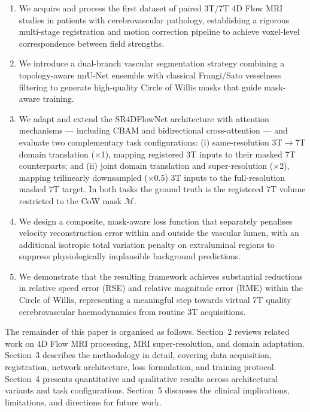\documentclass[11pt]{article}
\begin{document}
\begin{enumerate}
    \item We acquire and process the first dataset of paired 3T/7T 4D Flow MRI studies in patients with cerebrovascular pathology, establishing a rigorous multi-stage registration and motion correction pipeline to achieve voxel-level correspondence between field strengths.

    \item We introduce a dual-branch vascular segmentation strategy combining a topology-aware nnU-Net ensemble \cite{isensee2021nnunet,yang2023topcow} with classical Frangi/Sato vesselness filtering \cite{frangi1998,sato1998} to generate high-quality Circle of Willis masks that guide mask-aware training.

    \item We adapt and extend the SR4DFlowNet architecture \cite{ferdian2020,elahmar2023} with attention mechanisms --- including CBAM \cite{woo2018cbam} and bidirectional cross-attention \cite{vaswani2017attention} --- and evaluate two complementary task configurations: (i) same-resolution 3T$\to$7T domain translation ($\times$1), mapping registered 3T inputs to their masked 7T counterparts; and (ii) joint domain translation and super-resolution ($\times$2), mapping trilinearly downsampled ($\times$0.5) 3T inputs to the full-resolution masked 7T target. In both tasks the ground truth is the registered 7T volume restricted to the CoW mask $\mathcal{M}$.

    \item We design a composite, mask-aware loss function that separately penalises velocity reconstruction error within and outside the vascular lumen, with an additional isotropic total variation penalty \cite{rudin1992tv} on extraluminal regions to suppress physiologically implausible background predictions.

    \item We demonstrate that the resulting framework achieves substantial reductions in relative speed error (RSE) and relative magnitude error (RME) within the Circle of Willis, representing a meaningful step towards virtual 7T quality cerebrovascular haemodynamics from routine 3T acquisitions.
\end{enumerate}

The remainder of this paper is organised as follows. Section~2 reviews related work on 4D Flow MRI processing, MRI super-resolution, and domain adaptation. Section~3 describes the methodology in detail, covering data acquisition, registration, network architecture, loss formulation, and training protocol. Section~4 presents quantitative and qualitative results across architectural variants and task configurations. Section~5 discusses the clinical implications, limitations, and directions for future work.
\end{document}
